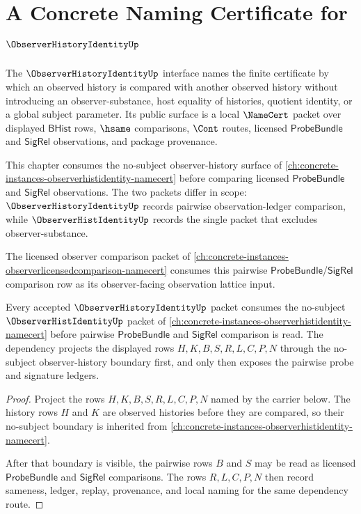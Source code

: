 \chapter{A Concrete Naming Certificate for $\ObserverHistoryIdentityUp$}
\label{ch:concrete-instances-observerhistoryidentity-namecert}

The $\ObserverHistoryIdentityUp$ interface names the finite certificate by which an observed history is compared with another observed history without introducing an observer-substance, host equality of histories, quotient identity, or a global subject parameter. Its public surface is a local $\NameCert$ packet over displayed $\mathsf{BHist}$ rows, $\hsame$ comparisons, $\Cont$ routes, licensed $\mathsf{ProbeBundle}$ and $\mathsf{SigRel}$ observations, and package provenance.

This chapter consumes the no-subject observer-history surface of \autoref{ch:concrete-instances-observerhistidentity-namecert} before comparing licensed $\mathsf{ProbeBundle}$ and $\mathsf{SigRel}$ observations. The two packets differ in scope: $\ObserverHistoryIdentityUp$ records pairwise observation-ledger comparison, while $\ObserverHistIdentityUp$ records the single packet that excludes observer-substance.

The licensed observer comparison packet of \autoref{ch:concrete-instances-observerlicensedcomparison-namecert} consumes this pairwise $\mathsf{ProbeBundle}$/$\mathsf{SigRel}$ comparison row as its observer-facing observation lattice input.

\begin{theorem}
\label{thm:observer-history-identity-observerhist-dependency}
Every accepted $\ObserverHistoryIdentityUp$ packet consumes the no-subject $\ObserverHistIdentityUp$ packet of \autoref{ch:concrete-instances-observerhistidentity-namecert} before pairwise $\mathsf{ProbeBundle}$ and $\mathsf{SigRel}$ comparison is read. The dependency projects the displayed rows $H,K,B,S,R,L,C,P,N$ through the no-subject observer-history boundary first, and only then exposes the pairwise probe and signature ledgers.
\end{theorem}
\begin{proof}
Project the rows $H,K,B,S,R,L,C,P,N$ named by the carrier below. The history rows $H$ and $K$ are observed histories before they are compared, so their no-subject boundary is inherited from \autoref{ch:concrete-instances-observerhistidentity-namecert}.

After that boundary is visible, the pairwise rows $B$ and $S$ may be read as licensed $\mathsf{ProbeBundle}$ and $\mathsf{SigRel}$ comparisons. The rows $R,L,C,P,N$ then record sameness, ledger, replay, provenance, and local naming for the same dependency route.
\end{proof}


